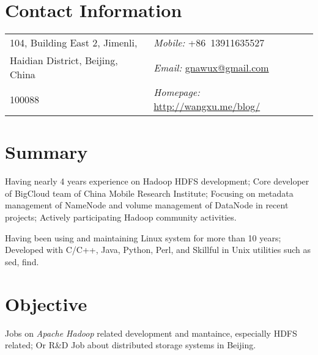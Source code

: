 \documentclass[a4paper,margin,line]{res}
\newcommand{\http}{http:/\hspace{-0.3ex}/}
\begin{document}

\begin{resume}

\section{\sc Contact Information}
\vspace{.05in}
\begin{tabular}{@{}p{2.9in}|p{2.5in}}
104, Building East 2, Jimenli,          & \textit{Mobile:} +86~13911635527\\
Haidian District, Beijing, China        & \textit{Email:}  \href{mailto:gnawux@gmail.com}{gnawux@gmail.com} \\
100088                                  & \textit{Homepage:} \href{http://wangxu.me/blog/}{\http{}wangxu.me/blog/} \\
                                                                   
\end{tabular}

\section{\sc Summary}
Having nearly 4 years experience on Hadoop HDFS development; Core developer of BigCloud team of China Mobile Research Institute; Focusing on metadata management of NameNode and volume management of DataNode in recent projects; Actively participating Hadoop community activities.

Having been using and maintaining Linux system for more than 10 years; Developed with C/C++, Java, Python, Perl, and Skillful in Unix utilities such as sed, find.

\section{\sc Objective}
Jobs on {\sl Apache Hadoop} related development and mantaince, especially HDFS related; Or R\&D Job about distributed storage systems in Beijing.


\end{resume}
\end{document}
